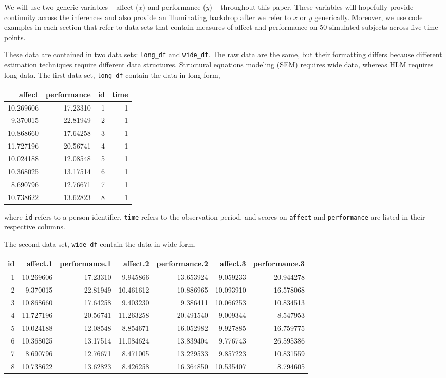 \documentclass[english,,man]{apa6}
\theoremstyle{definition}
\theoremstyle{definition}
\theoremstyle{definition}
\theoremstyle{remark}
\begin{document}
We will use two generic variables -- affect (\(x\)) and performance
(\(y\)) -- throughout this paper. These variables will hopefully provide
continuity across the inferences and also provide an illuminating
backdrop after we refer to \(x\) or \(y\) generically. Moreover, we use
code examples in each section that refer to data sets that contain
measures of affect and performance on 50 simulated subjects across five
time points.

These data are contained in two data sets: \texttt{long\_df} and
\texttt{wide\_df}. The raw data are the same, but their formatting
differs because different estimation techniques require different data
structures. Structural equations modeling (SEM) requires wide data,
whereas HLM requires long data. The first data set, \texttt{long\_df}
contain the data in long form,

\begin{tabular}{r|r|r|r}
\hline
affect & performance & id & time\\
\hline
10.269606 & 17.23310 & 1 & 1\\
\hline
9.370015 & 22.81949 & 2 & 1\\
\hline
10.868660 & 17.64258 & 3 & 1\\
\hline
11.727196 & 20.56741 & 4 & 1\\
\hline
10.024188 & 12.08548 & 5 & 1\\
\hline
10.368025 & 13.17514 & 6 & 1\\
\hline
8.690796 & 12.76671 & 7 & 1\\
\hline
10.738622 & 13.62823 & 8 & 1\\
\hline
\end{tabular}

\noindent where \texttt{id} refers to a person identifier, \texttt{time}
refers to the observation period, and scores on \texttt{affect} and
\texttt{performance} are listed in their respective columns.

The second data set, \texttt{wide\_df} contain the data in wide form,

\begin{tabular}{r|r|r|r|r|r|r}
\hline
id & affect.1 & performance.1 & affect.2 & performance.2 & affect.3 & performance.3\\
\hline
1 & 10.269606 & 17.23310 & 9.945866 & 13.653924 & 9.059233 & 20.944278\\
\hline
2 & 9.370015 & 22.81949 & 10.461612 & 10.886965 & 10.093910 & 16.578068\\
\hline
3 & 10.868660 & 17.64258 & 9.403230 & 9.386411 & 10.066253 & 10.834513\\
\hline
4 & 11.727196 & 20.56741 & 11.263258 & 20.491540 & 9.009344 & 8.547953\\
\hline
5 & 10.024188 & 12.08548 & 8.854671 & 16.052982 & 9.927885 & 16.759775\\
\hline
6 & 10.368025 & 13.17514 & 11.084624 & 13.839404 & 9.776743 & 26.595386\\
\hline
7 & 8.690796 & 12.76671 & 8.471005 & 13.229533 & 9.857223 & 10.831559\\
\hline
8 & 10.738622 & 13.62823 & 8.426258 & 16.364850 & 10.535407 & 8.794605\\
\hline
\end{tabular}
\end{document}
